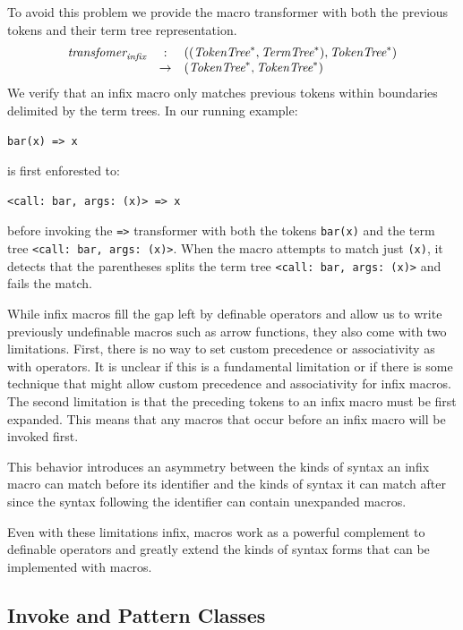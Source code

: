 \documentclass[preprint,10pt]{sigplanconf}
\begin{document}
To avoid this problem we provide the macro transformer with both the
previous tokens and their term tree representation.
\[
\begin{array}{rcl}
  \textit{transfomer}_{\textit{infix}} &:& ((\textit{TokenTree}^*, \textit{TermTree}^{*}), \textit{TokenTree}^*) 
  \\
  &\rightarrow& (\textit{TokenTree}^*, \textit{TokenTree}^*)
\end{array}
\]
We verify that an infix macro only
matches previous tokens within boundaries delimited by 
the term trees. In our running example:
\begin{lstlisting}
bar(x) => x
\end{lstlisting}
is first enforested to:
\begin{lstlisting}
<call: bar, args: (x)> => x
\end{lstlisting}
before invoking the \verb!=>! transformer with both the tokens
\verb!bar(x)! and the term tree
\verb!<call: bar, args: (x)>!. When the macro attempts to match
just \verb!(x)!, it detects that the parentheses splits the term
tree \verb!<call: bar, args: (x)>! and fails the match.

While infix macros fill the gap left by definable operators and allow
us to write previously undefinable macros such as arrow functions,
they also come with two limitations. First, there is no way to set
custom precedence or associativity as with operators. It is unclear
if this is a fundamental limitation or if there is some technique that
might allow custom precedence and associativity for infix macros.
The second limitation is that the preceding tokens to an infix macro
must be first expanded. This means that any macros that occur before
an infix macro will be invoked first.

This behavior introduces an asymmetry between the kinds of syntax an
infix macro can match before its identifier and the kinds of syntax it
can match after since the syntax following the identifier can contain
unexpanded macros.

Even with these limitations infix, macros work as a powerful complement
to definable operators and greatly extend the kinds of syntax forms
that can be implemented with macros.

\subsection{Invoke and Pattern Classes}
\label{sec:invoke}
\end{document}
